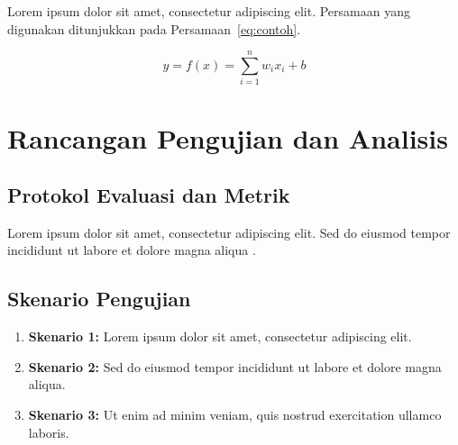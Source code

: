 
Lorem ipsum dolor sit amet, consectetur adipiscing elit. Persamaan yang digunakan ditunjukkan pada Persamaan~\eqref{eq:contoh}.

\begin{equation}
  y = f(x) = \sum_{i=1}^{n} w_i x_i + b
  \label{eq:contoh}
\end{equation}

\section{Rancangan Pengujian dan Analisis}


\subsection{Protokol Evaluasi dan Metrik}


Lorem ipsum dolor sit amet, consectetur adipiscing elit. Sed do eiusmod tempor incididunt ut labore et dolore magna aliqua \citep{referensi2}.

\subsection{Skenario Pengujian}


\begin{enumerate}
  \item \textbf{Skenario 1:} Lorem ipsum dolor sit amet, consectetur adipiscing elit.
  \item \textbf{Skenario 2:} Sed do eiusmod tempor incididunt ut labore et dolore magna aliqua.
  \item \textbf{Skenario 3:} Ut enim ad minim veniam, quis nostrud exercitation ullamco laboris.
\end{enumerate}
